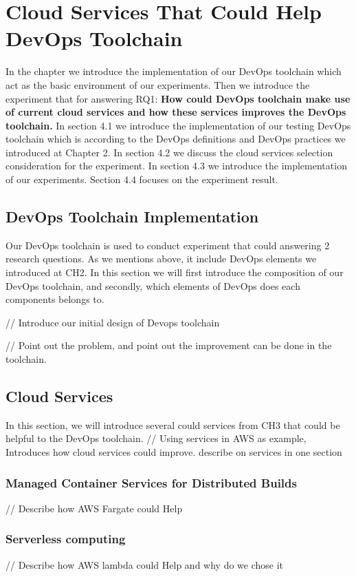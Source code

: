 \chapter{Cloud Services That Could Help DevOps Toolchain}
In the chapter we introduce the implementation of our DevOps toolchain which act as the basic environment of our experiments. Then we introduce the experiment that for answering RQ1: \textbf{How could DevOps toolchain make use of current cloud services and how these services improves the DevOps toolchain.} In section 4.1 we introduce the implementation of our testing DevOps toolchain which is according to the DevOps definitions and DevOps practices we introduced at Chapter 2. In section 4.2 we discuss the cloud services selection consideration for the experiment. In section 4.3 we introduce the implementation of our experiments. Section 4.4 focuses on the experiment result.
\section{DevOps Toolchain Implementation}
Our DevOps toolchain is used to conduct experiment that could answering 2 research questions. As we mentions above, it include DevOps elements we introduced at CH2. In this section we will first introduce the composition of our DevOps toolchain, and secondly, which elements of DevOps does each components belongs to.

// Introduce our initial design of Devops toolchain

// Point out the problem, and point out the improvement can be done in the toolchain.

\section{Cloud Services}
\label{assumption}
In this section, we will introduce several could services from CH3 that could be helpful to the DevOps toolchain. 
//  Using services in AWS as example, Introduces how cloud services could improve. describe on services in one section
\subsection{Managed Container Services for Distributed Builds} 

// Describe how AWS Fargate could Help
\subsection{Serverless computing}
// Describe how AWS lambda could Help and why do we chose it
